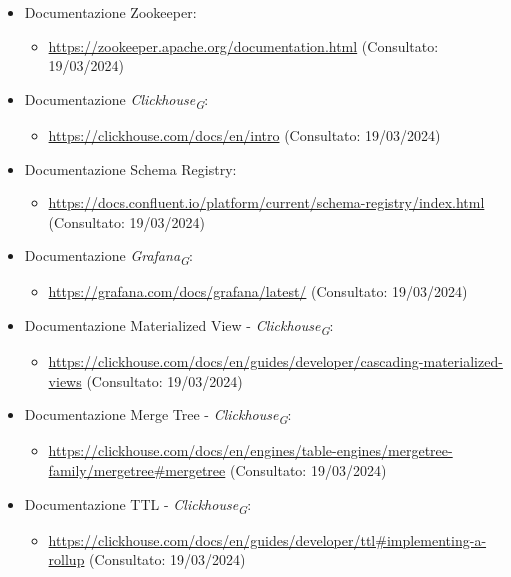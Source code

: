 \begin{itemize}
    \item Documentazione Zookeeper: 
    \begin{itemize}
        \item \url{https://zookeeper.apache.org/documentation.html} (Consultato: 19/03/2024)
    \end{itemize}
    \item Documentazione \textit{Clickhouse}\textsubscript{\textit{G}}: 
    \begin{itemize}
        \item \url{https://clickhouse.com/docs/en/intro} (Consultato: 19/03/2024)
    \end{itemize}
    \item Documentazione Schema Registry: 
    \begin{itemize}
        \item \url{https://docs.confluent.io/platform/current/schema-registry/index.html} (Consultato: 19/03/2024)
    \end{itemize}
    \item Documentazione \textit{Grafana}\textsubscript{\textit{G}}: 
    \begin{itemize}
        \item \url{https://grafana.com/docs/grafana/latest/} (Consultato: 19/03/2024)
    \end{itemize}
    \item Documentazione Materialized View - \textit{Clickhouse}\textsubscript{\textit{G}}: 
    \begin{itemize}
        \item \url{https://clickhouse.com/docs/en/guides/developer/cascading-materialized-views} (Consultato: 19/03/2024)
    \end{itemize}
    \item Documentazione Merge Tree - \textit{Clickhouse}\textsubscript{\textit{G}}: 
    \begin{itemize}
        \item \url{https://clickhouse.com/docs/en/engines/table-engines/mergetree-family/mergetree#mergetree} (Consultato: 19/03/2024)
    \end{itemize}
    \item Documentazione TTL - \textit{Clickhouse}\textsubscript{\textit{G}}: 
    \begin{itemize}
        \item \url{https://clickhouse.com/docs/en/guides/developer/ttl#implementing-a-rollup} (Consultato: 19/03/2024)
    \end{itemize}

\end{itemize}
